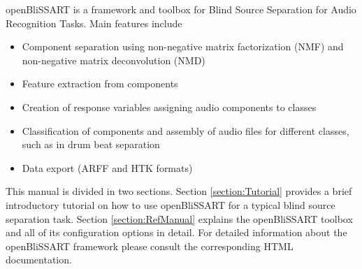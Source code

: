 %
%


openBliSSART is a framework and toolbox for Blind Source Separation for Audio
Recognition Tasks. Main features include

\begin{itemize}
\item Component separation using non-negative matrix factorization (NMF)
  \cite{Smaragdis2003} \cite{LeeSeung2001} and non-negative matrix deconvolution
  (NMD) \cite{Smaragdis2004}
\item Feature extraction from components
\item Creation of response variables assigning audio components to classes
\item Classification of components and assembly of audio files for different
  classes, such as in drum beat separation \cite{HelenVirtanen}
\item Data export (ARFF \cite{Weka} and HTK \cite{HTKBook} formats)
\end{itemize}

This manual is divided in two sections. Section \ref{section:Tutorial} provides
a brief introductory tutorial on how to use openBliSSART for a typical blind
source separation task. Section \ref{section:RefManual} explains the
openBliSSART toolbox and all of its configuration options in detail. For
detailed information about the openBliSSART framework please consult the
corresponding HTML documentation.

